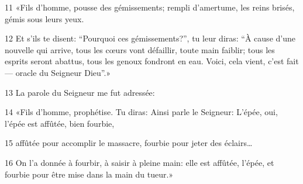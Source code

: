 11 «Fils d’homme, pousse des gémissements; rempli d’amertume, les reins brisés, gémis sous leurs yeux.

12 Et s’ils te disent: “Pourquoi ces gémissements?”, tu leur diras: “À cause d’une nouvelle qui arrive, tous les cœurs vont défaillir, toute main faiblir; tous les esprits seront abattus, tous les genoux fondront en eau. Voici, cela vient, c’est fait --- oracle du Seigneur Dieu”.»

13 La parole du Seigneur me fut adressée:

14 «Fils d’homme, prophétise. Tu diras: Ainsi parle le Seigneur: L’épée, oui, l’épée est affûtée, bien fourbie,

15 affûtée pour accomplir le massacre, fourbie pour jeter des éclairs…

16 On l’a donnée à fourbir, à saisir à pleine main: elle est affûtée, l’épée, et fourbie pour être mise dans la main du tueur.»